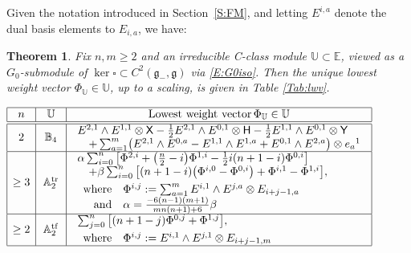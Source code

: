\documentclass[10pt,a4paper]{amsart}
\newcommand\tensor{\otimes}
\DeclareMathOperator{\tf}{tf}
\DeclareMathOperator{\tr}{tr}
\newcommand\fg{\mathfrak{g}}
\newcommand\bbE{\mathbb{E}}
\newcommand\bbU{\mathbb{U}}
\newcommand\bbA{\mathbb{A}}
\newcommand\bbB{\mathbb{B}}
\newcommand\sfX{\mathsf{X}}
\newcommand\sfH{\mathsf{H}}
\newcommand\sfY{\mathsf{Y}}
\numberwithin{equation}{section}
\newtheorem{Theorem}{Theorem}[section]
\begin{document}
 Given the notation introduced in Section~\ref{S:FM}, and letting $E^{i,a}$ denote the dual basis elements to $E_{i,a}$, we have:

\begin{Theorem}\label{T:lwv}
Fix $n,m \geq 2$ and an irreducible C-class module $\bbU \subset \bbE$, viewed as a $G_0$-submodule of $\ker\square \subset C^2(\fg_-,\fg)$ via \eqref{E:G0iso}. Then the unique lowest weight vector $\Phi_\bbU \in \bbU$, up to a scaling, is given in Table {\rm \ref{Tab:lwv}}.
\end{Theorem}
\begin{table}[h]\renewcommand{\arraystretch}{1.3}
\centering
$\begin{array}{|c|c|l|}\hline
n & \begin{array}{c}
\bbU\end{array}& \multicolumn{1}{c|}{\text{Lowest weight vector}\, \Phi_\bbU \in \bbU} \\\hline\hline
2 & \bbB_4 & \begin{array}{l}
E^{2,1} \wedge E^{1,1} \tensor \sfX -\frac{1}{2}E^{2,1} \wedge E^{0,1} \tensor \sfH -\frac{1}{2}E^{1,1} \wedge E^{0,1} \tensor \sfY \\ \quad + \sum_{a=1}^m \bigl(E^{2,1} \wedge E^{0,a} - E^{1,1} \wedge E^{1,a} + E^{0,1} \wedge E^{2,a} \bigr)\tensor e_a{}^1
\end{array} \\\hline
\ge 3 & \bbA_2^{\tr}&
 \begin{array}{l}
 \alpha \sum_{i=0}^n\big[\Phi^{2,i} + \bigl(\frac{n}{2}-i\bigr)\Phi^{1,i}-\frac{1}{2}i(n+1-i)\Phi^{0,i}\big] \\
\quad + \beta\sum_{i=0}^n \big[(n+1-i)\bigl(\Phi^{i,0}-\Phi^{0,i}\bigr) + \Phi^{i,1}-\Phi^{1,i}\big],\\[0.05in]
 \begin{array}{rl}
 \text{where} & \Phi^{i,j} := \sum_{a=1}^m E^{i,1}\wedge E^{j,a}\tensor E_{i+j-1,a}\\
 \text{and} & \alpha = \frac{-6(n-1)(m+1)}{mn(n+1)+6}\beta
 \end{array}
\end{array}
\\\hline
 \ge 2 & \bbA_2^{\tf}&
 \begin{array}{l}
 \sum_{j=0}^n\big[(n+1-j)\Phi^{0,j} + \Phi^{1,j}\big],\\[0.05in]
 \begin{array}{rl}
 \text{where} & \Phi^{i,j} := E^{i,1}\wedge E^{j,1}\tensor E_{i+j-1,m}
 \end{array}
 \end{array} \\ \hline
\end{array}$
\caption{Classification of lowest weight vectors $\Phi_{\bbU}$ for irreducible C-class modules $\bbU \subset \bbE$.}
\label{Tab:lwv}
\end{table}
\end{document}

